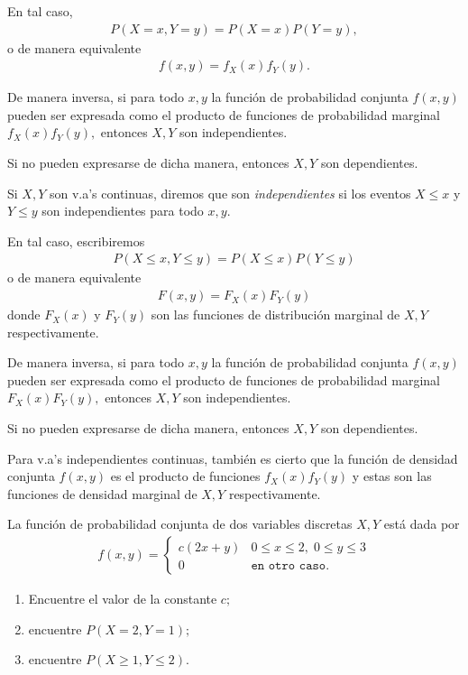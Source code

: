  En tal caso,
 \begin{align}
  \label{2.27}
  P(X=x,Y=y)=P(X=x)P(Y=y),
 \end{align}
o de manera equivalente
\begin{align}
 f(x,y)=f_{X}(x)f_{Y}(y).
\end{align}



 De manera inversa, si para todo $x,y$ la función de probabilidad conjunta $f(x,y)$ pueden ser expresada como el producto de funciones de probabilidad marginal $f_{X}(x)f_{Y}(y),$ entonces $X,Y$ son independientes.
 

 Si no pueden expresarse de dicha manera, entonces $X,Y$ son dependientes.


 Si $X,Y$ son v.a's continuas, diremos que son \emph{independientes} si los eventos $X\leq x$ y $Y\leq y$ son independientes para todo $x,y.$

 En tal caso, escribiremos
 \begin{align}
  \label{2.29}
  P(X\leq x, Y \leq y)=P(X\leq x)P(Y\leq y)
 \end{align} 
 o de manera equivalente
 \begin{align}
  F(x,y)=F_{X}(x)F_{Y}(y)
 \end{align}
 donde $F_{X}(x)$ y $F_{Y}(y)$ son las funciones de distribución marginal de $X,Y$ respectivamente.



 De manera inversa, si para todo $x,y$ la función de probabilidad conjunta $f(x,y)$ pueden ser expresada como el producto de funciones de probabilidad marginal $F_{X}(x)F_{Y}(y),$ entonces $X,Y$ son independientes.
 

 Si no pueden expresarse de dicha manera, entonces $X,Y$ son dependientes.


 Para v.a's independientes continuas, también es cierto que la función de densidad conjunta $f(x,y)$ es el producto de funciones $f_{X}(x)f_{Y}(y)$ y estas son las funciones de densidad marginal de $X,Y$ respectivamente.



 \begin{ejemplo}
  \label{sol:2.8}
  La función de probabilidad conjunta de dos variables discretas $X,Y$ está dada por
  \begin{align}
   f(x,y)=
   \begin{cases}
    c(2x+y) & 0\leq x \leq 2, \; 0 \leq y \leq 3 \\
    0 & \texttt{en otro caso}.
   \end{cases}
  \end{align}
  \begin{enumerate}
   \item Encuentre el valor de la constante $c;$
   \item encuentre $P(X=2,Y=1);$
   \item encuentre $P(X\geq 1, Y\leq 2).$
  \end{enumerate}

 \end{ejemplo}



